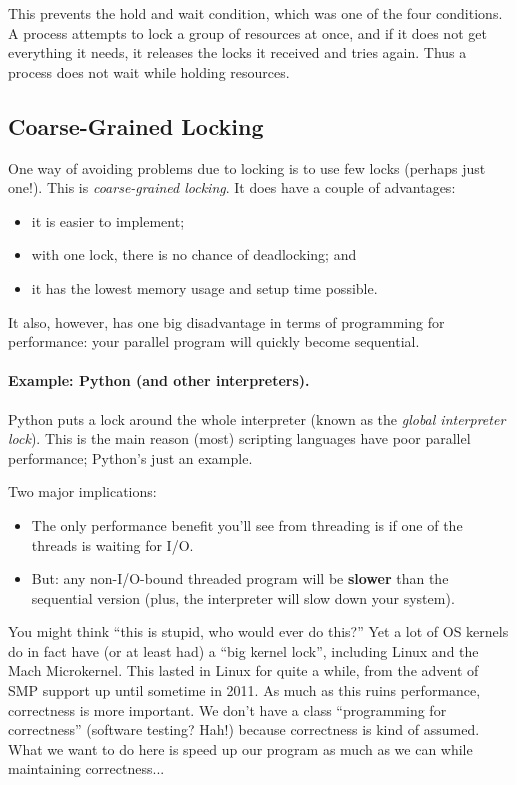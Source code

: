 \documentclass[a4paper]{report}
\begin{document}
This prevents the hold and wait condition, which was one of the four conditions. A process attempts to lock a group of resources at once, and if it does not get everything it needs, it releases the locks it received and tries again. Thus a process does not wait while holding resources.

\subsection*{Coarse-Grained Locking}
One way of avoiding problems due to locking is to use few locks
(perhaps just one!). This is \emph{coarse-grained locking}.
It does have a couple of advantages:
  \begin{itemize}
    \item it is easier to implement;
    \item with one lock, there is no chance of deadlocking; and
    \item it has the lowest memory usage and setup time possible.
  \end{itemize}

It also, however, has one big disadvantage in terms of programming for performance: your parallel program will quickly become sequential.

\paragraph{Example: Python (and other interpreters).}
Python puts a lock around the whole interpreter (known as the
\emph{global interpreter lock}).  This is the main reason (most)
scripting languages have poor parallel performance; Python's just an
example.

Two major implications:
\begin{itemize}
\item The only performance benefit you'll see from threading is if one of the threads is
      waiting for I/O.
\item But: any non-I/O-bound threaded program will be {\bf slower} than the sequential
      version (plus, the interpreter will slow down your system).
\end{itemize}

You might think ``this is stupid, who would ever do this?'' Yet a lot of OS kernels do in fact have (or at least had) a ``big kernel lock'', including Linux and the Mach Microkernel. This lasted in Linux for quite a while, from the advent of SMP support up until sometime in 2011. As much as this ruins performance, correctness is more important. We don't have a class ``programming for correctness'' (software testing? Hah!) because correctness is kind of assumed. What we want to do here is speed up our program as much as we can while maintaining correctness...
\end{document}
